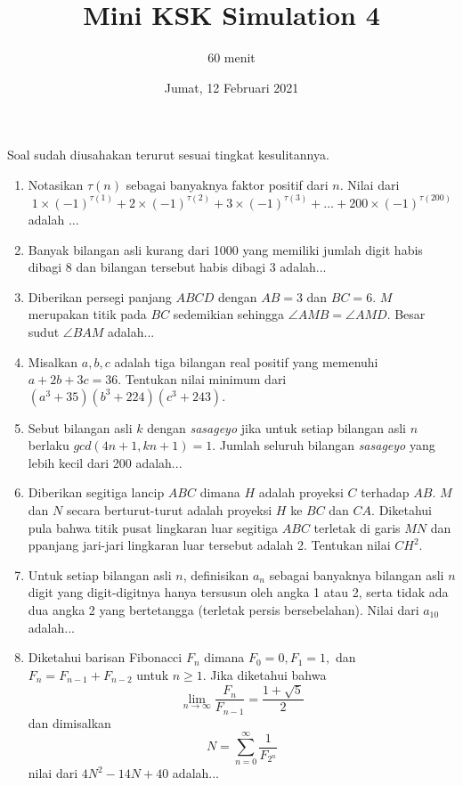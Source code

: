 \documentclass{article}
\title{Mini KSK Simulation 4}
\author{60 menit}
\date{Jumat, 12 Februari 2021}
\begin{document}
	\maketitle
	
	Soal sudah diusahakan terurut sesuai tingkat kesulitannya.
	\begin{enumerate}
		\item
		Notasikan $\tau(n)$ sebagai banyaknya faktor positif dari $n$. Nilai dari $$1 \times(-1)^{\tau(1)} + 2 \times (-1)^{\tau(2)} + 3 \times (-1)^{\tau(3)} + \dots + 200 \times (-1)^{\tau(200)}$$ adalah ...
		
		\item
		Banyak bilangan asli kurang dari 1000 yang memiliki jumlah digit habis dibagi 8 dan bilangan tersebut habis dibagi 3 adalah...
		
		\item Diberikan persegi panjang $ABCD$ dengan $AB = 3$ dan $BC = 6$. $M$ merupakan titik pada $BC$ sedemikian sehingga $\angle AMB = \angle AMD$. Besar sudut $\angle BAM$ adalah...
		
		\item
		Misalkan $a,b,c$ adalah tiga bilangan real positif yang memenuhi $a+2b+3c=36$. Tentukan nilai minimum dari $(a^3+35)(b^3+224)(c^3+243).$
		
		\item
		Sebut bilangan asli $k$ dengan \textit{sasageyo} jika untuk setiap bilangan asli $n$ berlaku $gcd(4n+1,kn+1)=1$. Jumlah seluruh bilangan \textit{sasageyo} yang lebih kecil dari 200 adalah...
		
		\item
		Diberikan segitiga lancip $ABC$ dimana $H$ adalah proyeksi $C$ terhadap $AB$. $M$ dan $N$ secara berturut-turut adalah proyeksi $H$ ke $BC$ dan $CA$. Diketahui pula bahwa titik pusat lingkaran luar segitiga $ABC$ terletak di garis $MN$ dan ppanjang jari-jari lingkaran luar tersebut adalah 2. Tentukan nilai $CH^2$.
		
		\item
		Untuk setiap bilangan asli $n$, definisikan $a_n$ sebagai banyaknya bilangan asli $n$ digit yang digit-digitnya hanya tersusun oleh angka 1 atau 2, serta tidak ada dua angka 2 yang bertetangga (terletak persis bersebelahan). Nilai dari $a_{10}$ adalah...
		
		\item
		Diketahui barisan Fibonacci ${F_n}$ dimana $F_0 = 0 , F_1 = 1,$ dan $F_n = F_{n-1} + F_{n-2}$ untuk $n \ge 1$. Jika diketahui bahwa $$\lim\limits_{n \rightarrow \infty} \dfrac{F_n}{F_{n-1}} = \dfrac{1+\sqrt{5}}{2}$$ dan dimisalkan $$N = \sum_{n = 0}^{\infty} \dfrac{1}{F_{2^n}}$$ nilai dari $4N^2-14N +40$ adalah...
	\end{enumerate}
		
\end{document}
